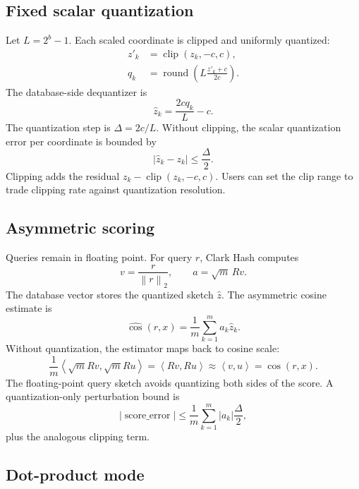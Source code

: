 \documentclass[11pt]{article}
\newcommand{\norm}[1]{\left\lVert #1 \right\rVert_2}
\newcommand{\inner}[2]{\left\langle #1, #2 \right\rangle}
\begin{document}
\subsection{Fixed scalar quantization}

Let $L=2^b-1$. Each scaled coordinate is clipped and uniformly quantized:
\begin{align}
z'_k &= \operatorname{clip}(z_k,-c,c),\\
q_k &= \operatorname{round}\!\left(L\frac{z'_k+c}{2c}\right).
\end{align}
The database-side dequantizer is
\begin{equation}
\hat{z}_k = \frac{2c q_k}{L} - c.
\end{equation}
The quantization step is $\Delta = 2c/L$. Without clipping, the scalar
quantization error per coordinate is bounded by
\begin{equation}
|\hat{z}_k - z_k| \leq \frac{\Delta}{2}.
\end{equation}
Clipping adds the residual $z_k-\operatorname{clip}(z_k,-c,c)$. Users can set
the clip range to trade clipping rate against quantization resolution.

\subsection{Asymmetric scoring}

Queries remain in floating point. For query $r$, Clark Hash computes
\begin{equation}
v = \frac{r}{\norm{r}}, \qquad a = \sqrt{m}\,Rv.
\end{equation}
The database vector stores the quantized sketch $\hat{z}$. The asymmetric
cosine estimate is
\begin{equation}
\widehat{\cos}(r,x) = \frac{1}{m} \sum_{k=1}^{m} a_k \hat{z}_k.
\end{equation}
Without quantization, the estimator maps back to cosine scale:
\begin{equation}
\frac{1}{m}\inner{\sqrt{m}Rv}{\sqrt{m}Ru}
= \inner{Rv}{Ru}
\approx \inner{v}{u}
= \cos(r,x).
\end{equation}
The floating-point query sketch avoids quantizing both sides of the score.
A quantization-only perturbation bound is
\begin{equation}
|\operatorname{score\_error}|
\leq \frac{1}{m}\sum_{k=1}^{m}|a_k|\frac{\Delta}{2},
\end{equation}
plus the analogous clipping term.

\subsection{Dot-product mode}
\end{document}
